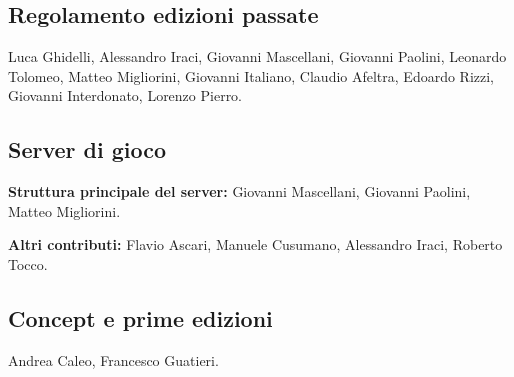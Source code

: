 \documentclass[a4paper,10pt]{article}
\begin{document}

\subsection*{Regolamento edizioni passate}

Luca Ghidelli, Alessandro Iraci, Giovanni Mascellani, Giovanni Paolini, Leonardo Tolomeo, Matteo Migliorini, Giovanni Italiano, Claudio Afeltra, Edoardo Rizzi, Giovanni Interdonato, Lorenzo Pierro.

\subsection*{Server di gioco}

\textbf{Struttura principale del server:} Giovanni Mascellani, Giovanni Paolini, Matteo Migliorini.

\textbf{Altri contributi:} Flavio Ascari, Manuele Cusumano, Alessandro Iraci, Roberto Tocco.

\subsection*{Concept e prime edizioni}

Andrea Caleo, Francesco Guatieri.
\end{document}
